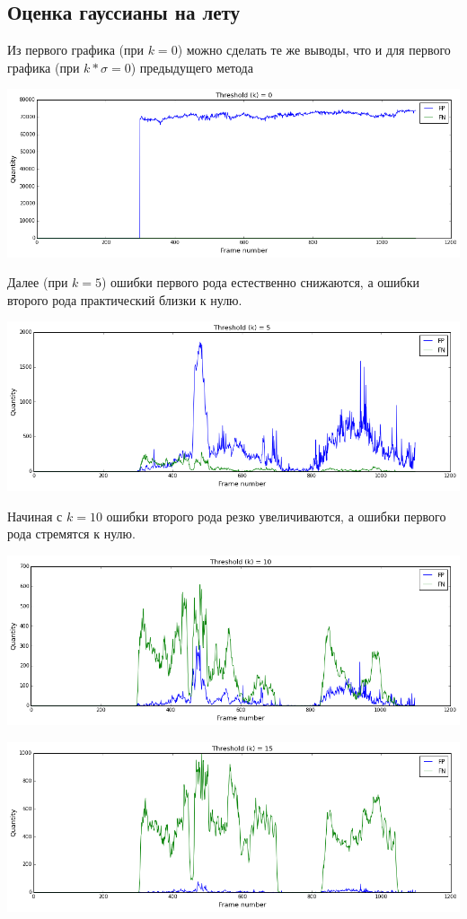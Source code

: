 \documentclass[12pt, a4paper]{article}
\begin{document}
		\newpage
		\subsection{Оценка гауссианы на лету}
			Из первого графика (при $k = 0$) можно сделать те же выводы, что и для первого графика (при $k * \sigma = 0$) предыдущего метода
			\begin{center}
				\includegraphics[width=17cm]{2par_k_0.png}
			\end{center}

			Далее (при $k = 5$) ошибки первого рода естественно снижаются, а ошибки второго рода практический близки к нулю.
			\begin{center}
				\includegraphics[width=17cm]{2par_k_5.png}
			\end{center}

			Начиная с $k = 10$ ошибки второго рода резко увеличиваются, а ошибки первого рода стремятся к нулю.
			\begin{center}
				\includegraphics[width=17cm]{2par_k_10.png}
			\end{center}
			\begin{center}
				\includegraphics[width=17cm]{2par_k_15.png}
			\end{center}
\end{document}
